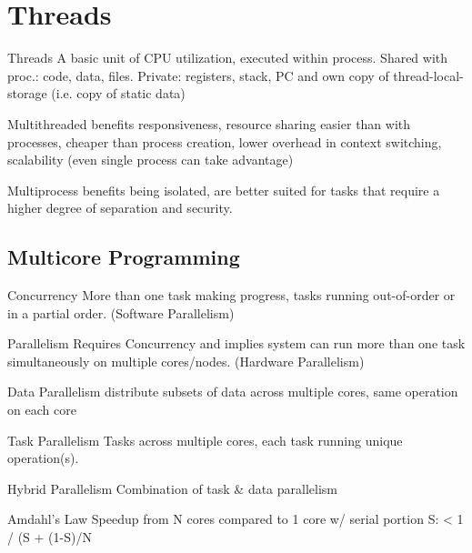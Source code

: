 \section*{Threads}
\begin{definition}
  \item[Threads] A basic unit of CPU utilization, executed within process.  Shared with proc.: code, data, files. Private: registers, stack, PC and own copy of thread-local-storage (i.e. copy of static data)
  \item[Multithreaded benefits] responsiveness, resource sharing easier than with processes, cheaper than process creation, lower overhead in context switching, scalability (even single process can take advantage)
  \item[Multiprocess benefits] being isolated, are better suited for tasks that require a  higher degree of separation and security.  \end{definition}

\subsection*{Multicore Programming}
\begin{definition}
  \item[Concurrency] More than one task making progress, tasks running out-of-order or in a partial order. (Software Parallelism)
  \item[Parallelism] Requires Concurrency and implies system can run more than one task simultaneously on multiple cores/nodes. (Hardware Parallelism)
  \item[Data Parallelism] distribute subsets of data across multiple cores, same operation on each core
  \item[Task Parallelism]  Tasks across  multiple cores, each task running unique operation(s). 
  \item[Hybrid Parallelism] Combination of task \& data parallelism
  \item[Amdahl's Law] Speedup from N cores compared to 1 core w/ serial portion S: < 1 / (S + (1-S)/N
\end{definition}

